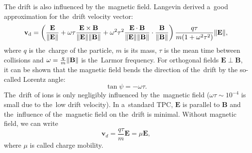 			The drift is also influenced by the~magnetic field. Langevin derived a~good approximation for the~drift velocity vector:
				\begin{equation}
					\label{eq:drift}
					\mathbf{v}_\text{d} = \left(\frac{\mathbf{E}}{\norm{\mathbf{E}}} + \omega\tau\frac{\mathbf{E}\times\mathbf{B}}{\norm{\mathbf{E}}\norm{\mathbf{B}}} + \omega^2\tau^2\frac{\mathbf{E}\cdot\mathbf{B}}{\norm{\mathbf{E}}\norm{\mathbf{B}}}\cdot \frac{\mathbf{B}}{\norm{\mathbf{B}}}\right) \frac{q\tau}{m(1+\omega^2\tau^2)}\norm{\mathbf{E}},
				\end{equation}
			where $q$ is the~charge of the particle, $m$ is its mass, $\tau$ is the mean time between collisions and $\omega = \frac{q}{m}\norm{\mathbf{B}}$ is the~Larmor frequency. For orthogonal fields $\mathbf{E}\perp\mathbf{B}$, it can be shown that the magnetic field bends the direction of the~drift by the so\nobreakdash-called Lorentz angle:
				\begin{equation}
					\label{eq:lorentz}
					\tan\psi = -\omega\tau.
				\end{equation}
			The~drift of ions is only negligibly influenced by the~magnetic field ($\omega\tau\sim10^{-4}$ is small due to the~low drift velocity). In a~standard \ac{TPC}, $\mathbf{E}$ is parallel to $\mathbf{B}$ and the~influence of the~magnetic field on the~drift is minimal. Without magnetic field, we can write
				\begin{equation}
					\mathbf{v}_d = \frac{q\tau}{m} \mathbf{E} = \mu \mathbf{E},
				\end{equation}
			where $\mu$ is called charge mobility.
			
